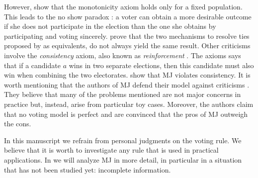 However, \citet{Felsenthal2008,Laslier2018} show that the monotonicity axiom holds only for a fixed population. This leads to the no show paradox \citep{Fishburn1983}: a voter can obtain a more desirable outcome if she does not participate in the election than the one she obtains by participating and voting sincerely. 
\citet{Felsenthal2008,Zahid2009} prove that the two mechanisms to resolve ties proposed by \citet{Balinski2011} as equivalents, do not always yield the same result. 
Other criticisms involve the \textit{consistency} axiom, also known as \textit{reinforcement} \citep{Young1974,Young1975}. The axioms says that if a candidate $a$ wins in two separate elections, then this candidate must also win when combining the two electorates. \citet{Felsenthal2008} show that \ac{MJ} violates consistency.
It is worth mentioning that the authors of \ac{MJ} defend their model against criticisms \citep{Balinski2011,Balinski2019}. They believe that many of the problems mentioned are not major concerns in practice but, instead, arise from particular toy cases. Moreover, the authors claim that no voting model is perfect and are convinced that the pros of MJ outweigh the cons.

In this manuscript we refrain from personal judgments on the voting rule. We believe that it is worth to investigate any rule that is used in practical applications. In  we will analyze \ac{MJ} in more detail, in particular in a situation that has not been studied yet: incomplete information.









